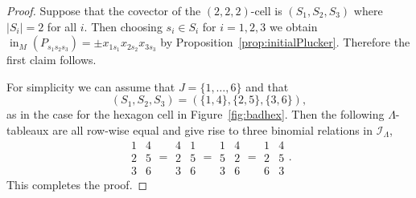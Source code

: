 \documentclass[ALCO,ThmDefs,Unicode,epreuves]{cedram}
\DeclareMathOperator{\ini}{in}
\newcommand{\I}{\mathcal{I}}
\begin{document}
\begin{proof}
Suppose that the covector of the $(2, 2, 2)$-cell is $(S_1,S_2, S_3)$
where $|S_i| = 2$ for all $i$. Then choosing $s_i \in S_i$ for $i = 1, 2, 3$ we obtain $\ini_M(P_{s_1s_2s_3}) = \pm x_{1s_1}x_{2s_2}x_{3s_3}$ 
by Proposition~\ref{prop:initialPlucker}. Therefore the first claim follows. 

For simplicity we can assume that $J = \{1, \ldots, 6\}$ and that 
\[
(S_1, S_2, S_3) = (\{1, 4\}, \{2, 5\}, \{3, 6\}),
\] 
as in the case for the hexagon cell in Figure~\ref{fig:badhex}. Then the following $\Lambda$-tableaux are all row-wise equal and give rise to three binomial relations in $\I_{\Lambda}$, 
\[
\begin{array}{c}1 \\2 \\3\end{array} 
\begin{array}{c}4 \\5 \\6\end{array} = 
\begin{array}{c}4 \\2 \\3\end{array} 
\begin{array}{c}1 \\5 \\6\end{array}=
\begin{array}{c}1 \\5 \\3\end{array} 
\begin{array}{c}4 \\2 \\6\end{array}= 
\begin{array}{c}1 \\2 \\6\end{array} 
\begin{array}{c}4 \\5 \\3\end{array}.
\]
This completes the proof.
\end{proof}
\end{document}
